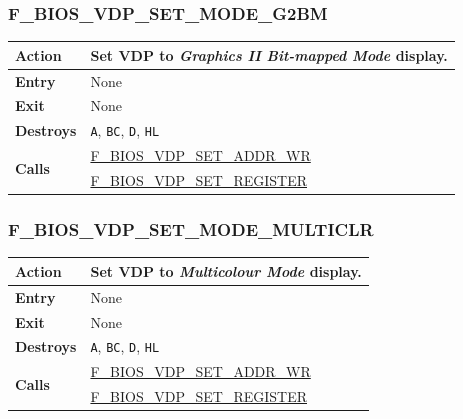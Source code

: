 \documentclass[a4paper,11pt]{article}
\begin{document}
        \subsubsection{F\_BIOS\_VDP\_SET\_MODE\_G2BM}
        \label{func:fbiosvdpsetmodeg2bm}
        \begin{tabular}{l p{9cm}}
            \hline\textbf{Action}
            & Set \textbf{VDP} to \textit{Graphics II Bit-mapped Mode} display.\\
            \hline\textbf{Entry} & None\\
            \hline\textbf{Exit} & None\\
            \hline\textbf{Destroys} & \texttt{A}, \texttt{BC}, \texttt{D},
            \texttt{HL} \\
            \hline\multirow[t]{2}{4em}{\textbf{Calls}}
            & \hyperref[func:fbiosvdpsetaddrwr]{F\_BIOS\_VDP\_SET\_ADDR\_WR}\\
            & \hyperref[func:fbiosvdpsetregister]{F\_BIOS\_VDP\_SET\_REGISTER}\\
            \hline
        \end{tabular}

        \subsubsection{F\_BIOS\_VDP\_SET\_MODE\_MULTICLR}
        \label{func:fbiosvdpsetmodemulticlr}
        \begin{tabular}{l p{9cm}}
            \hline\textbf{Action}
            & Set \textbf{VDP} to \textit{Multicolour Mode} display.\\
            \hline\textbf{Entry} & None\\
            \hline\textbf{Exit} & None\\
            \hline\textbf{Destroys} & \texttt{A}, \texttt{BC}, \texttt{D},
            \texttt{HL} \\
            \hline\multirow[t]{2}{4em}{\textbf{Calls}}
            & \hyperref[func:fbiosvdpsetaddrwr]{F\_BIOS\_VDP\_SET\_ADDR\_WR}\\
            & \hyperref[func:fbiosvdpsetregister]{F\_BIOS\_VDP\_SET\_REGISTER}\\
            \hline
        \end{tabular}
\end{document}
